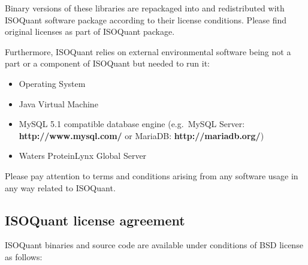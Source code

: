 \documentclass[]{article}
\providecommand{\tightlist}{%
  \setlength{\itemsep}{0pt}\setlength{\parskip}{0pt}}
\begin{document}
Binary versions of these libraries are repackaged into and redistributed
with ISOQuant software package according to their license conditions.
Please find original licenses as part of ISOQuant package.

Furthermore, ISOQuant relies on external environmental software being
not a part or a component of ISOQuant but needed to run it:

\begin{itemize}
\tightlist
\item
  Operating System
\item
  Java Virtual Machine
\item
  MySQL 5.1 compatible database engine (e.g.~MySQL Server:
  \textbf{http://www.mysql.com/} or MariaDB:
  \textbf{http://mariadb.org/})
\item
  Waters ProteinLynx Global Server
\end{itemize}

Please pay attention to terms and conditions arising from any software
usage in any way related to ISOQuant.

\clearpage

\subsection{\texorpdfstring{ISOQuant license agreement
\label{bsdlicense}}{ISOQuant license agreement }}\label{isoquant-license-agreement}

ISOQuant binaries and source code are available under conditions of BSD
license as follows:
\end{document}
